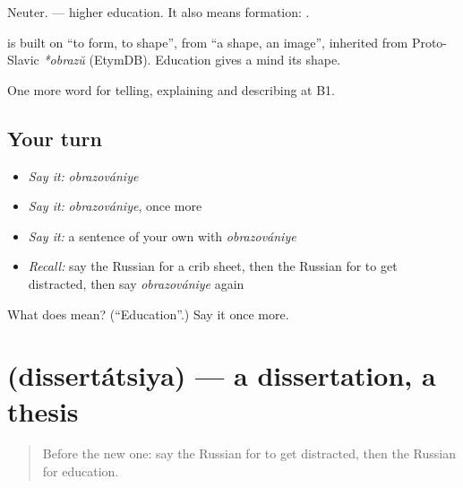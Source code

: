 Neuter. \emph{ } — higher education. It also means formation: \emph{ }.

\begin{cousinweb}
\textbf{} is built on \emph{} \textquotedblleft{}to form, to shape\textquotedblright{}, from \emph{} \textquotedblleft{}a shape, an image\textquotedblright{}, inherited from Proto-Slavic \emph{*obrazŭ} (EtymDB). Education gives a mind its shape.
\end{cousinweb}

\begin{grammarlens}[title={What you've built}]
One more word for telling, explaining and describing at B1.
\end{grammarlens}

\subsection*{Your turn}
\begin{itemize}
\raggedright
  \item \emph{Say it:} \emph{obrazovániye}
  \item \emph{Say it:} \emph{obrazovániye}, once more
  \item \emph{Say it:} a sentence of your own with \emph{obrazovániye}
  \item \emph{Recall:} say the Russian for a crib sheet, then the Russian for to get distracted, then say \emph{obrazovániye} again
\end{itemize}

\begin{tcolorbox}[breakable,colback=teal!4,colframe=teal!35!black,title={Before you move on}]
What does  mean? (\textquotedblleft{}Education\textquotedblright{}.) Say it once more.
\end{tcolorbox}
\section[\texorpdfstring{\ru{диссертация} (dissertátsiya)}{диссертация (dissertátsiya)}]{ (dissertátsiya) — a dissertation, a thesis}

\label{lesson:RU-C385-dissertaciya}



\begin{quote}
Before the new one: say the Russian for to get distracted, then the Russian for education.
\end{quote}

